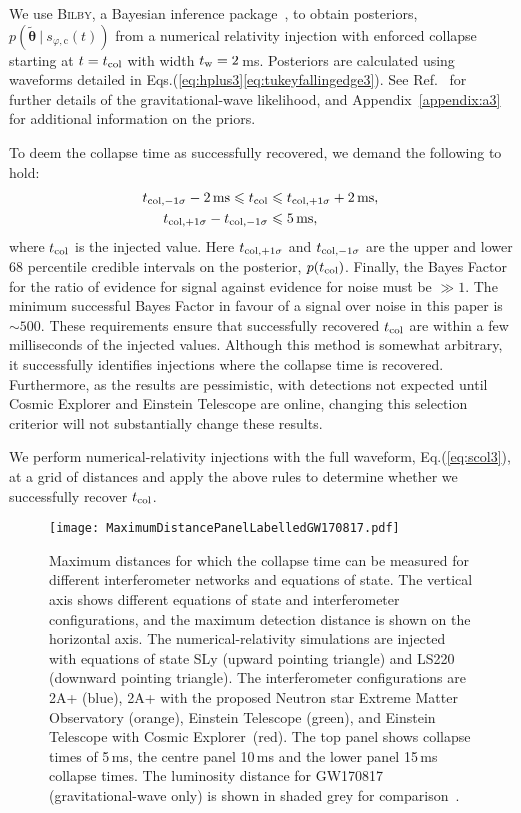 \documentclass[../Thesis.tex]{subfiles}
\begin{document}
    We use \textsc{Bilby}, a Bayesian inference package~\cite{Ashton2019}, to obtain posteriors, $p(\boldsymbol{\tilde{\theta}}~|~s_{\varphi,\mathrm{c}}(t))$ from a numerical relativity injection with enforced collapse starting at $t=t_{\mathrm{col}}$ with width $t_{\mathrm{w}}=2$\,ms.
    Posteriors are calculated using waveforms detailed in Eqs.(\ref{eq:hplus3}\Hyphdash*\ref{eq:tukeyfallingedge3}). 
    See Ref.~\cite{Easter2020} for further details of the gravitational-wave likelihood, and Appendix~\ref{appendix:a3} for additional information on the priors.
    \par
    \pagebreak
    To deem the collapse time as successfully recovered, we demand the following to hold: 
\begin{align}
    t_{\mathrm{col,-1\sigma}} - 2\,\mathrm{ms} \leqslant t_{\mathrm{col}} & \leqslant  t_{\mathrm{col,+1\sigma}} + 2\,\mathrm{ms},\\
    t_{\mathrm{col,+1\sigma}} - t_{\mathrm{col,-1\sigma}} & \leqslant  5\,\mathrm{ms},
\end{align}
    where $t_{\mathrm{col}}$ is the injected value. 
    Here $t_{\mathrm{col,+1\sigma}}$ and $t_{\mathrm{col,-1\sigma}}$ are the upper and lower 68 percentile credible intervals on the posterior,  $p(t_{\mathrm{col}})$.
    Finally, the Bayes Factor for the ratio of evidence for signal against evidence for noise must be $\gg 1$.
    The minimum successful Bayes Factor in favour of a signal over noise in this paper is $\sim\!500$.
    These requirements ensure that successfully recovered $t_{\mathrm{col}}$ are within a few milliseconds of the  injected values. 
    Although this method is somewhat arbitrary, it successfully identifies injections where the collapse time is recovered.
    Furthermore, as the results are pessimistic, with detections not expected until Cosmic Explorer and Einstein Telescope are online, changing this selection criterior will not substantially change these results. \par

    
    We perform numerical-relativity injections with the full waveform, Eq.(\ref{eq:scol3}), at a grid of distances and apply the above rules to determine whether we successfully recover $t_{\mathrm{col}}$.
\begin{figure*}
    \centering
    \texttt{[image: MaximumDistancePanelLabelledGW170817.pdf]}
    \caption{Maximum distances for which the collapse time can be measured for different interferometer networks and equations of state. The vertical axis shows different equations of state and interferometer configurations, and the maximum detection distance is shown on the horizontal axis. The numerical-relativity simulations are injected with equations of state SLy (upward pointing triangle) and LS220 (downward pointing triangle). The interferometer configurations are 2A+ (blue), 2A+ with the proposed Neutron star Extreme Matter Observatory (orange), Einstein Telescope (green), and Einstein Telescope with Cosmic Explorer~(red). The top panel shows collapse times of 5\,ms, the centre panel 10\,ms and the lower panel 15\,ms collapse times. The  luminosity distance for GW170817 (gravitational-wave only) is shown in shaded grey for comparison~\cite{GW170817multi}.} 
    \label{fig:CollapseTimeDistanceGrid}
\end{figure*} 
\vspace{-0.25cm}    
\end{document}
